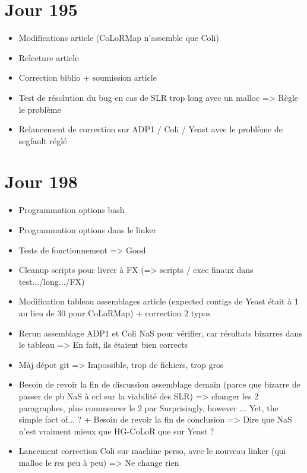 \documentclass[12pt]{report}
\begin{document}
\section{Jour 195}

\begin{itemize}
	\item Modifications article (CoLoRMap n'assemble que Coli)
	
	\item Relecture article
	
	\item Correction biblio + soumission article
	
	\item Test de résolution du bug en cas de SLR trop long avec un malloc => Règle le problème
	
	\item Relancement de correction sur ADP1 / Coli / Yeast avec le problème de segfault réglé
\end{itemize}

\section{Jour 198}

\begin{itemize}
	\item Programmation options bash
	
	\item Programmation options dans le linker
	
	\item Tests de fonctionnement => Good
	
	\item Cleanup scripts pour livrer à FX (=> scripts / exec finaux dans test.../long.../FX)
	
	\item Modification tableau assemblages article (expected contigs de Yeast était à 1 au lieu de 30 pour CoLoRMap) + correction 2 typos
	
	\item Rerun assemblage ADP1 et Coli NaS pour vérifier, car résultats bizarres dans le tableau => En fait, ils étaient bien corrects
	
	\item Màj dépot git => Impossible, trop de fichiers, trop gros
	
	\item Besoin de revoir la fin de discussion assemblage demain (parce que bizarre de passer de pb NaS à ccl sur la viabilité des SLR)
		  => changer les 2 paragraphes, plus commencer le 2 par Surprisingly, however ... Yet, the simple fact of... ?
		  + Besoin de revoir la fin de conclusion => Dire que NaS n'est vraiment mieux que HG-CoLoR que sur Yeast ?
	
	\item Lancement correction Coli sur machine perso, avec le nouveau linker (qui malloc le res peu à peu) => Ne change rien
\end{itemize}
\end{document}
